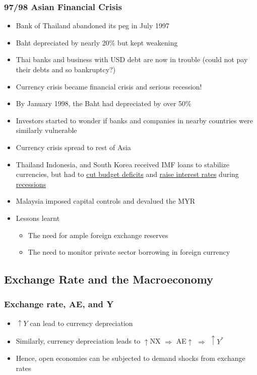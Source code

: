 \documentclass{article}
\begin{document}
\begin{multicols}{2}
\subsubsection{97/98 Asian Financial Crisis}
\begin{itemize}
	\item Bank of Thailand abandoned its peg in July 1997
	\item Baht depreciated by nearly 20\% but kept weakening
	\item Thai banks and business with USD debt are now in trouble (could not pay their debts and so bankruptcy?)
	\item Currency crisis became financial crisis and serious recession!
	\item By January 1998, the Baht had depreciated by over 50\%
	\item Investors started to wonder if banks and companies in nearby countries were similarly vulnerable
	\item Currency crisis spread to rest of Asia
	\item Thailand Indonesia, and South Korea received IMF loans to stabilize currencies, but had to \underline{cut budget deficits} and \underline{raise interest rates} during \underline{recessions}
	\item Malaysia imposed capital controls and devalued the MYR
	\item Lessons learnt
	\begin{itemize}
		\item The need for ample foreign exchange reserves
		\item The need to monitor private sector borrowing in foreign currency
	\end{itemize}
\end{itemize}
\subsection{Exchange Rate and the Macroeconomy}
\subsubsection{Exchange rate, AE, and Y}
\begin{itemize}
	\item $\uparrow Y$ can lead to currency depreciation
	\item Similarly, currency depreciation leads to $\uparrow$NX $\Rightarrow$ AE$\uparrow$ $\Rightarrow$ $\uparrow Y^*$
	\item Hence, open economies can be subjected to demand shocks from exchange rates
\end{itemize}

\end{multicols}
\end{document}
